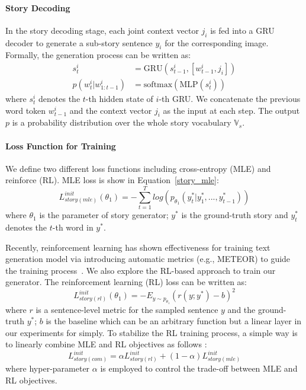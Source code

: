 \documentclass[11pt]{article}
\newcommand{\citep}{\cite}
\begin{document}
\paragraph{Story Decoding} 
In the story decoding stage, each joint context vector $j_i$ is fed into a GRU decoder to generate a sub-story sentence $y_i$ for the corresponding image. 
Formally, the generation process can be written as:
{
\begin{align}
s^i_t &= \text{GRU}(s^i_{t-1}, [w^i_{t-1}, j_i])  \\
p(w^i_{t}|w^i_{1:t-1}) &= \text{softmax}(\text{MLP}(s^i_t))
\end{align}
}where $s^i_t$ denotes the $t$-th hidden state of $i$-th GRU. We concatenate the previous word token $w^i_{t-1}$ and the context vector $j_i$ as the input at each step. The output $p$ is a probability distribution over the whole story vocabulary $\mathbb{V}_s$. 

\paragraph{Loss Function for Training} 
We define two different loss functions including cross-entropy (MLE) and reinforce (RL). MLE loss is show in Equation~\ref{story_mle}:
{
\begin{equation}
\label{story_mle}
L^{init}_{story(mle)}(\theta_1) = -\sum^{T}_{t=1}log(p_{\theta_1}(y^*_t|y^*_1,...,y^*_{t-1}))
\end{equation}}where $\theta_1$ is the parameter of story generator; $y^*$ is the ground-truth story and $y^*_t$ denotes the $t$-th word in $y^*$. 


Recently, reinforcement learning has shown effectiveness for training text generation model via introducing automatic metrics (e.g., METEOR) to guide the training process~\citep{Wang:2018tda}. We also explore the RL-based approach to train our generator. The reinforcement learning (RL) loss can be written as:
{
\begin{equation}
\label{story_rl}
L^{init}_{story(rl)}(\theta_1) = -E_{y \sim p_{\theta_1}}(r(y; y^*)-b)^2
\end{equation}
}where $r$ is a sentence-level metric for the sampled sentence $y$ and the ground-truth $y^*$; $b$ is the baseline which can be an arbitrary function but a linear layer in our experiments for simply. To stabilize the RL training process, a simple way is to linearly combine MLE and RL objectives as follows \citep{wu2018study}:
{
\begin{equation}
\label{story_com}
L^{init}_{story(com)} = \alpha L^{init}_{story(rl)}+(1-\alpha)L^{init}_{story(mle)}
\end{equation}
}where hyper-parameter $\alpha$ is employed to control the trade-off between MLE and RL objectives. 
\end{document}
